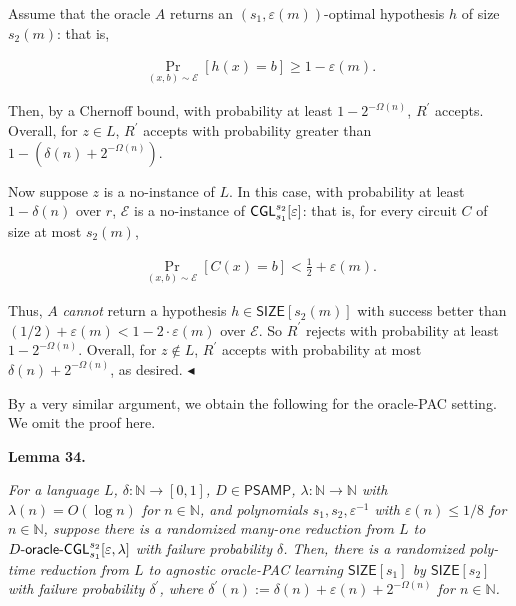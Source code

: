 \documentclass[10pt,a4paper]{article}
\begin{document}
Assume that the oracle $A$ returns an $(s_{1},\varepsilon(m))$-optimal hypothesis $h$ of size $s_{2}(m)$: that is,\par


\[\begin{gathered}
\Pr_{(x,b)\sim\mathcal{E}}[h(x)=b]\geq 1-\varepsilon(m).
\end{gathered}\]


Then, by a Chernoff bound, with probability at least $1-2^{-\Omega(n)}$, $R^{\prime}$ accepts. Overall, for $z\in L$, $R^{\prime}$ accepts with probability greater than $1-(\delta(n)+2^{-\Omega(n)})$.\par




Now suppose $z$ is a no-instance of $L$. In this case, with probability at least $1-\delta(n)$ over $r$, $\mathcal{E}$ is a no-instance of ${\sf CGL}_{s_{1}}^{s_{2}}[\varepsilon]$: that is, for every circuit $C$ of size at most $s_{2}(m)$,\par


\[\begin{gathered}
\Pr_{(x,b)\sim\mathcal{E}}[C(x)=b]<\frac{1}{2}+\varepsilon(m).
\end{gathered}\]


Thus, $A$ \emph{cannot} return a hypothesis $h\in{\mathsf{SIZE}}[s_{2}(m)]$ with success better than $(1/2)+\varepsilon(m)<1-2\cdot\varepsilon(m)$ over $\mathcal{E}$. So $R^{\prime}$ rejects with probability at least $1-2^{-\Omega(n)}$. Overall, for $z\notin L$, $R^{\prime}$ accepts with probability at most $\delta(n)+2^{-\Omega(n)}$, as desired.
$\blacktriangleleft$\par




By a very similar argument, we obtain the following for the oracle-PAC setting. We omit the proof here.\par





\par\medskip\noindent\textbf{
\textbf{Lemma 34}\textbf{.}
}\par



\emph{For a language $L$, $\delta:\mathbb{N}\to[0,1]$, $D\in{\mathsf{P}}{\mathsf{SAMP}}$, $\lambda:\mathbb{N}\to\mathbb{N}$ with $\lambda(n)=O(\log n)$ for $n\in\mathbb{N}$, and polynomials $s_{1},s_{2},\varepsilon^{-1}$ with $\varepsilon(n)\leq 1/8$ for $n\in\mathbb{N}$, suppose there is a randomized many-one reduction from $L$ to $D\text{-}{\sf oracle}\text{-}{\sf CGL}_{s_{1}}^{s_{2}}[\varepsilon,\lambda]$ with failure probability $\delta$. Then, there is a randomized poly-time reduction from $L$ to agnostic oracle-PAC learning ${\mathsf{SIZE}}[s_{1}]$ by ${\mathsf{SIZE}}[s_{2}]$ with failure probability $\delta^{\prime}$, where $\delta^{\prime}(n):=\delta(n)+\varepsilon(n)+2^{-\Omega(n)}$ for $n\in\mathbb{N}$.}\par
\end{document}
